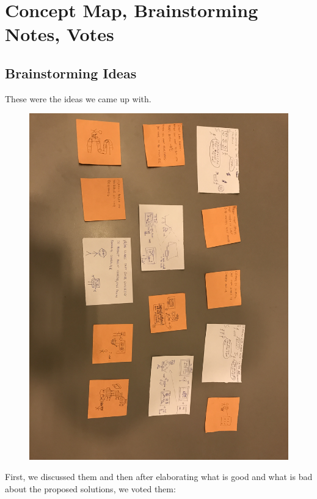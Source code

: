 \documentclass[a4paper,10pt,oneside]{scrreprt}
\begin{document}
		\clearpage

		\bigskip

	\section{Concept Map, Brainstorming Notes, Votes}
		\subsection{Brainstorming Ideas}
		
			These were the ideas we came up with.
		
				\begin{figure}[H]
					\centering
					\includegraphics[width=16cm, clip, trim={0em 20em 0em 35em}]{images/voting_pre.JPG}
				\end{figure}
		
			First, we discussed them and then after elaborating what is good and what is bad about the proposed solutions, we voted them:
			
\end{document}
